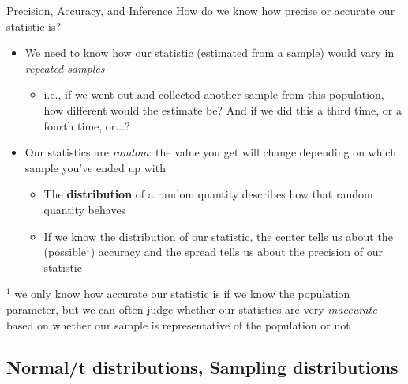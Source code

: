 \documentclass[10pt,t]{beamer}
\begin{document}
\begin{frame}{Precision, Accuracy, and Inference}
How do we know how precise or accurate our statistic is?

\vspace{0.1cm}

\begin{itemize}
	\item We need to know how our statistic (estimated from a sample) would vary in \textit{repeated samples}
	\begin{itemize}
		\item i.e., if we went out and collected another sample from this population, how different would the estimate be? And if we did this a third time, or a fourth time, or...?
	\end{itemize}
	\item Our statistics are \textit{random}: the value you get will change depending on which sample you've ended up with
	\begin{itemize}
		\item The \textbf{distribution} of a random quantity describes how that random quantity behaves
		\item If we know the distribution of our statistic, the center tells us about the (possible${}^1$) accuracy and the spread tells us about the precision of our statistic
	\end{itemize}
\end{itemize}

\vspace{0.1cm}

\small ${}^1$ we only know how accurate our statistic is if we know the population parameter, but we can often judge whether our statistics are very \textit{inaccurate} based on whether our sample is representative of the population or not

\end{frame}

\subsection{Normal/t distributions, Sampling distributions}
\end{document}
